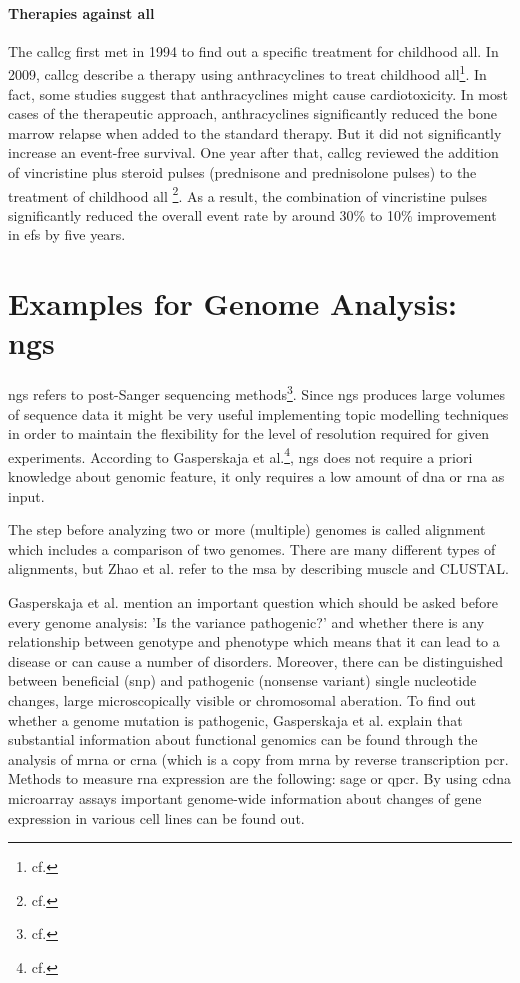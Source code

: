\paragraph{Therapies against \ac{all}}
The \ac{callcg} first met in 1994 to find out a specific treatment for childhood \ac{all}.
In 2009, \ac{callcg} describe a therapy using anthracyclines to treat childhood \ac{all}\footnote{cf.\autocite{callcg_2009}}. In fact, some studies suggest that anthracyclines might cause cardiotoxicity. In most cases of the therapeutic approach, anthracyclines significantly reduced the bone marrow relapse when added to the standard therapy. But it did not significantly increase an event-free survival.
One year after that, \ac{callcg} reviewed the addition of vincristine plus steroid pulses (prednisone and prednisolone pulses) to the treatment of childhood \ac{all} \footnote{cf.\autocite{callcg_2010}}. As a result, the combination of vincristine pulses significantly reduced the overall event rate by around 30\% to 10\% improvement in \ac{efs} by  five years.

\section{Examples for Genome Analysis: \ac{ngs}}\label{genome_analysis}
\ac{ngs} refers to post-Sanger sequencing methods\footnote{cf.\autocite{zhao_2016}}. Since \ac{ngs} produces large volumes of sequence data it might be very useful implementing topic modelling techniques in order to maintain the flexibility for the level of resolution required for given experiments.  
According to Gasperskaja et al.\footnote{cf.\autocite{gasperskaja_2017}}, \ac{ngs} does not require a priori knowledge about genomic feature, it only requires a low amount of \ac{dna} or \ac{rna} as input.

The step before analyzing two or more (multiple) genomes is called alignment which includes a comparison of two genomes. There are many different types of alignments, but Zhao et al. refer to the \ac{msa} by describing \ac{muscle} and CLUSTAL.

Gasperskaja et al. mention an important question which should be asked before every genome analysis: 'Is the variance pathogenic?' and whether there is any relationship between genotype and phenotype which means that it can lead to a disease or can cause a number of disorders. 
Moreover, there can be distinguished between beneficial (\ac{snp}) and pathogenic (nonsense variant) single nucleotide changes, large microscopically visible or chromosomal aberation. 
To find out whether a genome mutation is pathogenic, Gasperskaja et al. explain that substantial information about functional genomics can be found through the analysis of \ac{mrna} or \ac{crna} (which is a copy from \ac{mrna} by reverse transcription \ac{pcr}.
Methods to measure \ac{rna} expression are the following: \ac{sage} or \ac{qpcr}.
By using \ac{cdna} microarray assays important genome-wide information about changes of gene expression in various cell lines can be found out.

